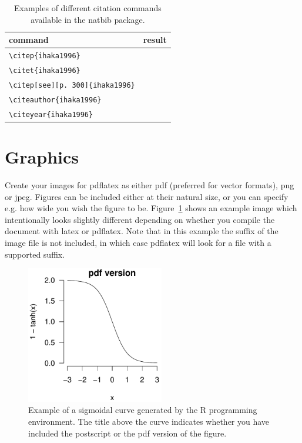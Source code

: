 \documentclass[]{article}
\begin{document}
\begin{table}
  \centering
  \begin{tabular}{ll}
    \hline
    command & result\\ \hline
    \verb+\citep{ihaka1996}+ & \citep{ihaka1996}\\
    \verb+\citet{ihaka1996}+ & \citet{ihaka1996}\\
    \verb+\citep[see][p. 300]{ihaka1996}+ &
    \citep[see][p. 300]{ihaka1996}
    \\
    \verb+\citeauthor{ihaka1996}+ & \citeauthor{ihaka1996}
    \\
    \verb+\citeyear{ihaka1996}+ & \citeyear{ihaka1996}
    \\
    \hline
  \end{tabular}
  \caption{Examples of different citation commands available in the
    natbib package.}
  \label{tab:cite}
\end{table}

\section{Graphics} \label{sec:graphics}

Create your images for pdflatex as either pdf (preferred for vector
formats), png or jpeg.  Figures can be included either at their
natural size, or you can specify e.g. how wide you wish the figure to
be. Figure~\ref{fig:example} shows an example image which
intentionally looks slightly different depending on whether you
compile the document with latex or pdflatex.  Note that in this
example the suffix of the image file is not included, in which case
pdflatex will look for a file with a supported suffix.

\begin{figure}
  \centering
  \includegraphics[width=6cm]{sigmoid}
  \caption{Example of a sigmoidal curve generated by the R programming
    environment.  The title above the curve indicates whether you have
  included the postscript or the pdf version of the figure.}
  \label{fig:example}
\end{figure}
\end{document}
